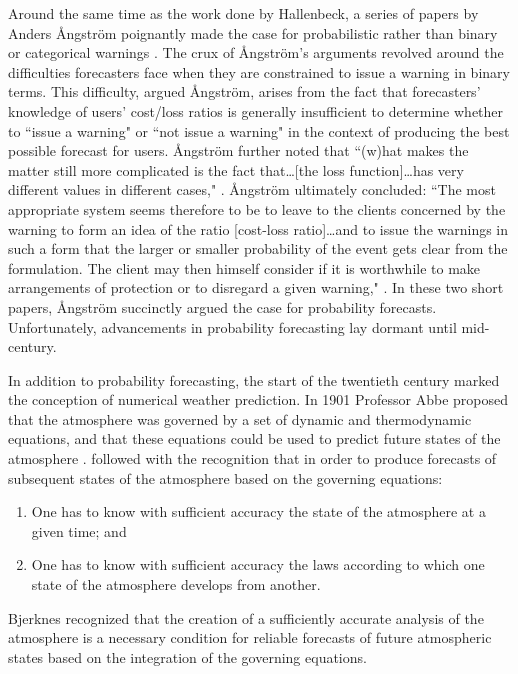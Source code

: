 Around the same time as the work done by Hallenbeck, a series of papers by Anders {{\AA}}ngstr{{\"o}}m poignantly made the case for probabilistic rather than binary or categorical warnings \citep{Angstrom1919, Angstrom1922, Liljas1994, Murphy1998}.
The crux of {{\AA}}ngstr{{\"o}}m's arguments revolved around the difficulties forecasters face when they are constrained to issue a warning in binary terms.
This difficulty, argued {{\AA}}ngstr{{\"o}}m, arises from the fact that forecasters' knowledge of users' cost/loss ratios is generally insufficient to determine whether to ``issue a warning" or ``not issue a warning" in the context of producing the best possible forecast for users.
{{\AA}}ngstr{{\"o}}m further noted that ``(w)hat makes the matter still more complicated is the fact that\dots [the loss function]\dots has very different values in different cases," \citep{Angstrom1922, Murphy1998}. {{\AA}}ngstr{{\"o}}m ultimately concluded: ``The most appropriate system seems therefore to be to leave to the clients concerned by the warning to form an idea of the ratio [cost-loss ratio]\dots and to issue the warnings in such a form that the larger or smaller probability of the event gets clear from the formulation.
The client may then himself consider if it is worthwhile to make arrangements of protection or to disregard a given warning," \citep{Angstrom1922, Murphy1998}.
In these two short papers, {{\AA}}ngstr{{\"o}}m succinctly argued the case for probability forecasts.
Unfortunately, advancements in probability forecasting lay dormant until mid-century.


In addition to probability forecasting, the start of the twentieth century marked the conception of numerical weather prediction.
In 1901 Professor Abbe proposed that the atmosphere was governed by a set of dynamic and thermodynamic equations, and that these equations could be used to predict future states of the atmosphere \citep{Abbe1901}.
\cite{Bjerknes1904} followed with the recognition that in order to produce forecasts of subsequent states of the atmosphere based on the governing equations:
\begin{enumerate}
    \item One has to know with sufficient accuracy the state of the atmosphere at a given time; and
    \item One has to know with sufficient accuracy the laws according to which one state of the atmosphere develops from another.
\end{enumerate}
Bjerknes recognized that the creation of a sufficiently accurate analysis of the atmosphere is a necessary condition for reliable forecasts of future atmospheric states based on the integration of the governing equations.



